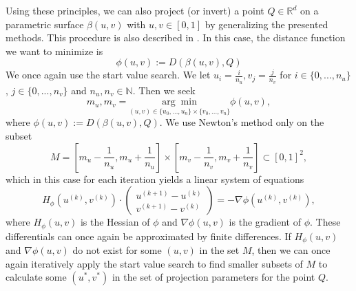 \documentclass[a4paper, 11pt]{report}
\theoremstyle{definition}
\begin{document}
	Using these principles, we can also project (or invert) a point $Q \in \mathbb{R}^d$ on a parametric surface $\beta(u,v)$ with $u,v \in [0,1]$ by generalizing the presented methods. This procedure is also described in \cite{Piegl1997}.
	In this case, the distance function we want to minimize is 
		$$ \phi(u,v) := D(\beta(u,v), Q)$$
	We once again use the start value search. We let $u_i = \frac{i}{n_u}, v_j = \frac{j}{n_v}$ for $i \in \{0, ..., n_u\}$, $j \in \{0,..., n_v\}$ and $n_u, n_v \in \mathbb{N}$. Then we seek
		$$ m_u, m_v = \underset{(u,v)\in\{u_0, ..., u_n\} \times \{v_0, ..., v_n\}}{\arg\min} \phi(u,v), $$
	where $\phi(u,v) := D(\beta(u,v), Q)$. We use Newton's method only on the subset
		$$  M = [m_u - \frac{1}{n_u}, m_u + \frac{1}{n_u}] \times [m_v - \frac{1}{n_v}, m_v + \frac{1}{n_v}] \subset [0,1]^2, $$
	which in this case for each iteration yields a linear system of equations
		$$ 	
			H_\phi
			\left(
					u^{(k)},
					v^{(k)}
			\right)
			\cdot
			\begin{pmatrix}
				u^{(k+1)} - u^{(k)} \\
				v^{(k+1)} - v^{(k)} 
			\end{pmatrix} 
			=
			-\nabla \phi
			\left(
					u^{(k)},
					v^{(k)}
			\right),
		$$
	where $H_\phi(u,v)$ is the Hessian of $\phi$ and $\nabla \phi(u,v)$ is the gradient of $\phi$. These differentials can once again be approximated by finite differences. If $H_\phi(u,v)$ and $\nabla \phi(u,v)$ do not exist for some $(u,v)$ in the set $M$, then we can once again iteratively apply the start value search to find smaller subsets of $M$ to calculate some $(u^*, v^*)$ in the set of projection parameters for the point $Q$.
\end{document}
